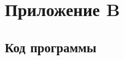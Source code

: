 \documentclass[a4paper, 12pt]{article}
\begin{document}
\cleardoublepage

\setcounter{subsection}{0}
\section*{Приложение B}
\renewcommand\thesection{\Alph{section}}
\renewcommand\thesubsection{B.\arabic{subsection}}

\subsection{Код программы}

\fontsize{9}{9}\selectfont
\begin{verbatim}

\end{verbatim}
\end{document}
